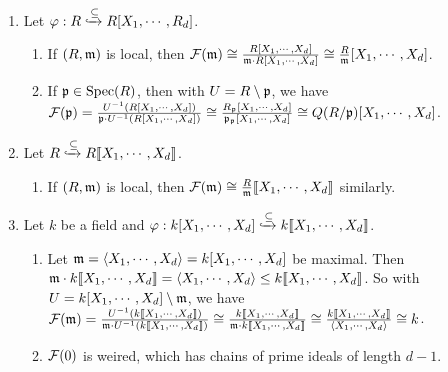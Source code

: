 \begin{example}
    \begin{enumerate}
        \item Let $\varphi: R \xhookrightarrow \subseteq R[X_1,\cdots,R_d]$.
            \begin{enumerate}
                \item If $(R,\mathfrak{m})$ is local, then $\mathcal{F}(\mathfrak{m}) \cong \frac{R[X_1,\cdots,X_d]}{\mathfrak{m} \cdot R[X_1,\cdots,X_d]} \cong \frac{R}{\mathfrak{m}}[X_1,\cdots,X_d]$.
                \item If $\mathfrak{p} \in \operatorname{Spec}(R)$, then with $U = R \setminus \mathfrak{p}$, we have $\mathcal{F}(\mathfrak{p}) = \frac{U^{-1}(R[X_1,\cdots,X_d])}{\mathfrak{p} \cdot U^{-1}(R[X_1,\cdots,X_d])} \cong \frac{R_{\mathfrak{p}}[X_1,\cdots,X_d]}{\mathfrak{p}_{\mathfrak{p}}[X_1,\cdots,X_d]} \cong Q(R/\mathfrak{p})[X_1,\cdots,X_d]$.
            \end{enumerate}
        \item 
            Let $R \xhookrightarrow{\subseteq} R\llbracket X_1,\cdots,X_d \rrbracket$.
            \begin{enumerate}
                \item If $(R,\mathfrak{m})$ is local, then $\mathcal{F}(\mathfrak{m}) \cong \frac{R}{\mathfrak{m}}\llbracket X_1,\cdots,X_d \rrbracket$ similarly.
            \end{enumerate}
        \item
            Let $k$ be a field and $\varphi: k[X_1,\cdots,X_d] \xhookrightarrow{\subseteq} k\llbracket X_1,\cdots,X_d \rrbracket$.
            \begin{enumerate}
                \item Let $\mathfrak{m} = \langle X_1,\cdots,X_d \rangle = k[X_1,\cdots,X_d]$ be maximal. Then $\mathfrak{m} \cdot k\llbracket X_1,\cdots,X_d \rrbracket = \langle X_1,\cdots,X_d \rangle \leq k\llbracket X_1,\cdots,X_d \rrbracket$. So with $U = k[X_1,\cdots,X_d] \setminus \mathfrak{m}$, we have $\mathcal{F}(\mathfrak{m}) = \frac{U^{-1}(k\llbracket X_1,\cdots,X_d \rrbracket)}{\mathfrak{m} \cdot U^{-1}(k\llbracket X_1,\cdots,X_d \rrbracket)} \cong \frac{k\llbracket X_1,\cdots,X_d \rrbracket}{\mathfrak{m} \cdot k\llbracket X_1,\cdots,X_d \rrbracket} \cong \frac{k\llbracket X_1,\cdots,X_d \rrbracket}{\langle X_1,\cdots,X_d \rangle} \cong k$.
                \item $\mathcal{F}(0)$ is weired, which has chains of prime ideals of length $d-1$.
            \end{enumerate}
    \end{enumerate}
\end{example}

